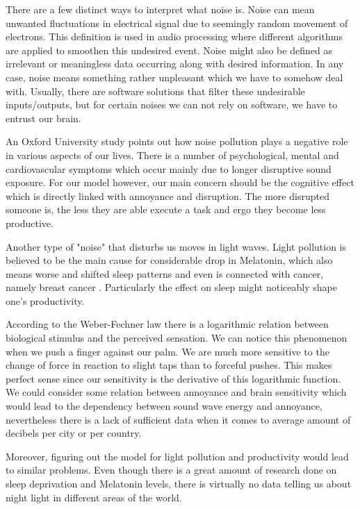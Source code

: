 There are a few distinct ways to interpret what noise is. Noise can mean unwanted fluctuations in electrical signal due to seemingly random movement of electrons. This definition is used in audio processing where different algorithms are applied to smoothen this undesired event. Noise might also be defined as irrelevant or meaningless data occurring along with desired information. In any case, noise means something rather unpleasant which we have to somehow deal with. Usually, there are software solutions that filter these undesirable inputs/outputs, but for certain noises we can not rely on software, we have to entrust our brain.


An Oxford University study \cite{Stansfeld2003} points out how noise pollution plays a negative role in various aspects of our lives. There is a number of psychological, mental and cardiovascular symptoms which occur mainly due to longer disruptive sound exposure. For our model however, our main concern should be the cognitive effect which is directly linked with annoyance and disruption. The more disrupted someone is, the less they are able execute a task and ergo they become less productive. 


Another type of "noise" that disturbs us moves in light waves. Light pollution is believed to be the main cause for considerable drop in Melatonin, which also means worse and shifted sleep patterns and even is connected with cancer, namely breast cancer \cite{Chepesiuk2009}. Particularly the effect on sleep might noticeably shape one's productivity.


According to the Weber-Fechner law there is a logarithmic relation between biological stimulus and the perceived sensation. We can notice this phenomenon when we push a finger against our palm. We are much more sensitive to the change of force in reaction to slight taps than to forceful pushes. This makes perfect sense since our sensitivity is the derivative of this logarithmic function. We could consider some relation between annoyance and brain sensitivity which would lead to the dependency between sound wave energy and annoyance, nevertheless there is a lack of sufficient data when it comes to average amount of decibels per city or per country. 


Moreover, figuring out the model for light pollution and productivity would lead to similar problems. Even though there is a great amount of research done on sleep deprivation and Melatonin levels, there is virtually no data telling us about night light in different areas of the world. 


